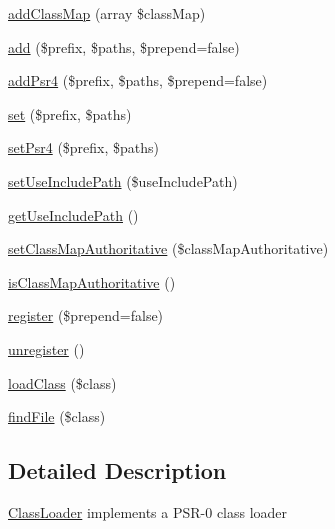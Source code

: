 \begin{DoxyCompactItemize}
\item 
\hyperlink{classComposer_1_1Autoload_1_1ClassLoader_a246d6f628e6ae99bf0ce65b0212f833a}{add\+Class\+Map} (array \$class\+Map)
\item 
\hyperlink{classComposer_1_1Autoload_1_1ClassLoader_aa99f46d61bdf20b924a1bb08bfcb90bd}{add} (\$prefix, \$paths, \$prepend=false)
\item 
\hyperlink{classComposer_1_1Autoload_1_1ClassLoader_a8831c0a7bb01fa44b4cb7a72ec111cf1}{add\+Psr4} (\$prefix, \$paths, \$prepend=false)
\item 
\hyperlink{classComposer_1_1Autoload_1_1ClassLoader_a76f8e2aa4329d78063cc7932108891ce}{set} (\$prefix, \$paths)
\item 
\hyperlink{classComposer_1_1Autoload_1_1ClassLoader_a11d2831d7657855b5c07cb6885dd86ef}{set\+Psr4} (\$prefix, \$paths)
\item 
\hyperlink{classComposer_1_1Autoload_1_1ClassLoader_a350f3d947ee3e29b0ac0e09e4a086642}{set\+Use\+Include\+Path} (\$use\+Include\+Path)
\item 
\hyperlink{classComposer_1_1Autoload_1_1ClassLoader_aeb0360ce32c89c3d50cf5b054aef0d59}{get\+Use\+Include\+Path} ()
\item 
\hyperlink{classComposer_1_1Autoload_1_1ClassLoader_ab393ccb89c488ca52fe97865b0957196}{set\+Class\+Map\+Authoritative} (\$class\+Map\+Authoritative)
\item 
\hyperlink{classComposer_1_1Autoload_1_1ClassLoader_abaf3d2e9cad5d740b6a29c44b36cf015}{is\+Class\+Map\+Authoritative} ()
\item 
\hyperlink{classComposer_1_1Autoload_1_1ClassLoader_a478eedf860efe1bc1b2408fc28656111}{register} (\$prepend=false)
\item 
\hyperlink{classComposer_1_1Autoload_1_1ClassLoader_a2472d57551ee473381beea31ff642136}{unregister} ()
\item 
\hyperlink{classComposer_1_1Autoload_1_1ClassLoader_aee0b004fbf0743f16dab70f8a52f983e}{load\+Class} (\$class)
\item 
\hyperlink{classComposer_1_1Autoload_1_1ClassLoader_a505e9f4e4a29f6bd47bc694e78ae46c3}{find\+File} (\$class)
\end{DoxyCompactItemize}


\subsection{Detailed Description}
\hyperlink{classComposer_1_1Autoload_1_1ClassLoader}{Class\+Loader} implements a P\+S\+R-\/0 class loader

